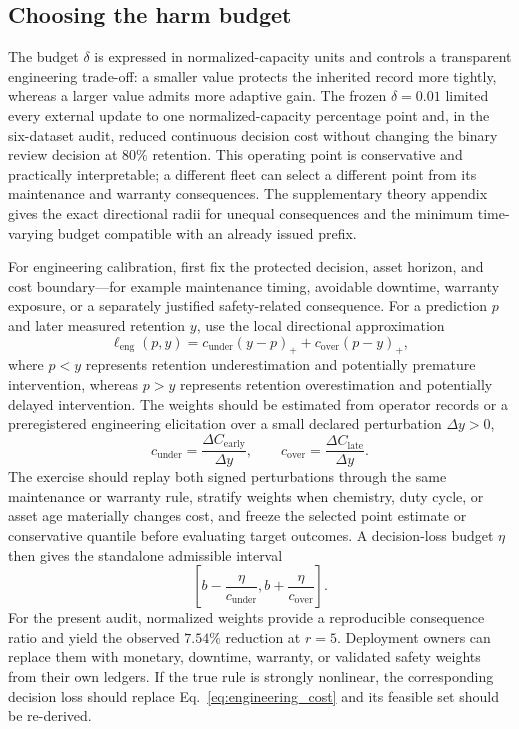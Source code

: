 \documentclass[preprint,12pt]{elsarticle}
\begin{document}
\subsection{Choosing the harm budget}

The budget $\delta$ is expressed in normalized-capacity units and controls a transparent engineering trade-off: a smaller value protects the inherited record more tightly, whereas a larger value admits more adaptive gain. The frozen $\delta=0.01$ limited every external update to one normalized-capacity percentage point and, in the six-dataset audit, reduced continuous decision cost without changing the binary review decision at $80\%$ retention. This operating point is conservative and practically interpretable; a different fleet can select a different point from its maintenance and warranty consequences. The supplementary theory appendix gives the exact directional radii for unequal consequences and the minimum time-varying budget compatible with an already issued prefix.

For engineering calibration, first fix the protected decision, asset horizon, and cost boundary---for example maintenance timing, avoidable downtime, warranty exposure, or a separately justified safety-related consequence. For a prediction $p$ and later measured retention $y$, use the local directional approximation
\begin{equation}
  \ell_{\mathrm{eng}}(p,y)
  =c_{\mathrm{under}}(y-p)_{+}
  +c_{\mathrm{over}}(p-y)_{+},
  \label{eq:engineering_cost}
\end{equation}
where $p<y$ represents retention underestimation and potentially premature intervention, whereas $p>y$ represents retention overestimation and potentially delayed intervention. The weights should be estimated from operator records or a preregistered engineering elicitation over a small declared perturbation $\Delta y>0$,
\begin{equation}
  c_{\mathrm{under}}=\frac{\Delta C_{\mathrm{early}}}{\Delta y},
  \qquad
  c_{\mathrm{over}}=\frac{\Delta C_{\mathrm{late}}}{\Delta y}.
  \label{eq:engineering_weights}
\end{equation}
The exercise should replay both signed perturbations through the same maintenance or warranty rule, stratify weights when chemistry, duty cycle, or asset age materially changes cost, and freeze the selected point estimate or conservative quantile before evaluating target outcomes. A decision-loss budget $\eta$ then gives the standalone admissible interval
\begin{equation}
  \left[b-\frac{\eta}{c_{\mathrm{under}}},
        b+\frac{\eta}{c_{\mathrm{over}}}\right].
  \label{eq:engineering_interval}
\end{equation}
For the present audit, normalized weights provide a reproducible consequence ratio and yield the observed $7.54\%$ reduction at $r=5$. Deployment owners can replace them with monetary, downtime, warranty, or validated safety weights from their own ledgers. If the true rule is strongly nonlinear, the corresponding decision loss should replace Eq.~\eqref{eq:engineering_cost} and its feasible set should be re-derived.
\end{document}
